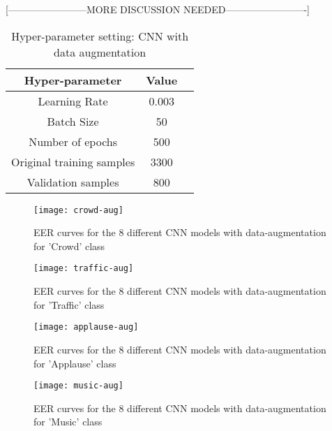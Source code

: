 [------------------------MORE DISCUSSION NEEDED-------------------------]

\begin{table}[tb]
\caption[Hyper-paramter setting: CNN with data augmentation]{Hyper-parameter setting: CNN with data augmentation}
\label{tab:cnn_aug_db2}
\centering
\begin{tabular}{ccc}
\toprule
Hyper-parameter & Value  \\
\midrule
Learning Rate	& 0.003\\
Batch Size	& 50\\
Number of epochs & 500\\
Original training samples 	& 3300\\
Validation samples & 800\\
\bottomrule 
\end{tabular}
\end{table}


\begin{figure}[!htb] 
\centering 
\texttt{[image: crowd-aug]}
\caption[EER curves for the 8 different CNN models with data-augmentation for 'Crowd' class]{EER curves for the 8 different CNN models with data-augmentation for 'Crowd' class}
\label{fig:crowd-aug} 
\end{figure}

\begin{figure}[!htb] 
\centering 
\texttt{[image: traffic-aug]}
\caption[EER curves for the 8 different CNN models with data-augmentation for 'Traffic' class]{EER curves for the 8 different CNN models with data-augmentation for 'Traffic' class}
\label{fig:traffic-aug} 
\end{figure}

\begin{figure}[!htb] 
\centering 
\texttt{[image: applause-aug]}
\caption[EER curves for the 8 different CNN models with data-augmentation for 'Applause' class]{EER curves for the 8 different CNN models with data-augmentation for 'Applause' class}
\label{fig:applause-aug} 
\end{figure}

\begin{figure}[!htb] 
\centering 
\texttt{[image: music-aug]}
\caption[EER curves for the 8 different CNN models with data-augmentation for 'Music' class]{EER curves for the 8 different CNN models with data-augmentation for 'Music' class}
\label{fig:music-aug} 
\end{figure}

